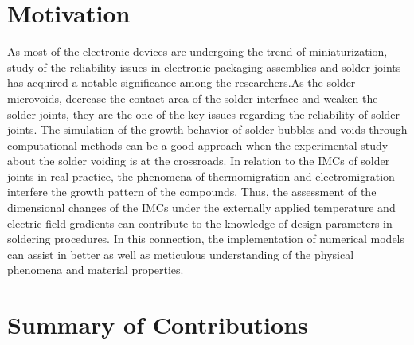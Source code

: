 \section{Motivation}\label{Chap1_01}
As most of the electronic devices are undergoing the trend of miniaturization, study of the reliability issues in electronic packaging assemblies and solder joints has acquired a notable significance among the researchers.As the solder microvoids, decrease the contact area of the solder interface and weaken the solder joints, they are the one of the key issues regarding the reliability of solder joints. The simulation of the growth behavior of solder bubbles and voids through computational methods can be a good approach when the experimental study about the solder voiding is at the crossroads. In relation to the IMCs of solder joints in real practice, the phenomena of thermomigration and electromigration interfere the growth pattern of the compounds. Thus, the assessment of the dimensional changes of the IMCs under the externally applied temperature  and electric field  gradients can contribute to the knowledge of design parameters in soldering procedures. In this connection, the implementation of numerical models can assist in better  as well as meticulous understanding of the physical phenomena and material properties.

\section{Summary of Contributions}\label{Chap1_02}

